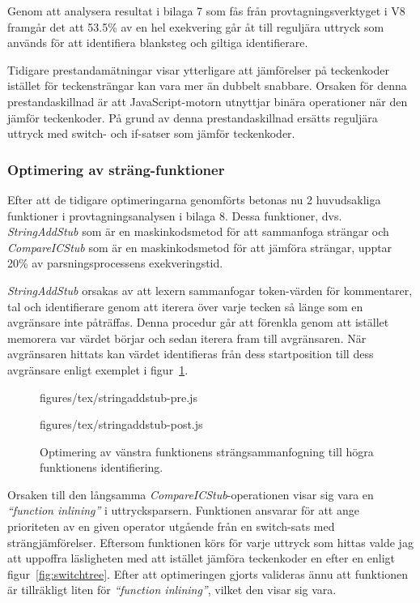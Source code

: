 Genom att analysera resultat i bilaga 7 som fås från provtagningsverktyget i
V8 framgår det att 53.5\% av en hel exekvering går åt till reguljära uttryck
som används för att identifiera blanksteg och giltiga identifierare.

Tidigare prestandamätningar \citep{charcodeat} visar ytterligare att
jämförelser på teckenkoder istället för teckensträngar kan vara mer än dubbelt
snabbare. Orsaken för denna prestandaskillnad är att JavaScript-motorn
utnyttjar binära operationer när den jämför teckenkoder. På grund av denna
prestandaskillnad ersätts reguljära uttryck med switch- och if-satser som
jämför teckenkoder.

\subsubsection{Optimering av sträng-funktioner}

Efter att de tidigare optimeringarna genomförts betonas nu 2 huvudsakliga
funktioner i provtagningsanalysen i bilaga 8. Dessa funktioner, dvs.
\textit{StringAddStub} som är en maskinkodsmetod för att sammanfoga strängar
och \textit{CompareICStub} som är en maskinkodsmetod för att jämföra strängar,
upptar 20\% av parsningsprocessens exekveringstid.

\textit{StringAddStub} orsakas av att lexern sammanfogar token-värden för
kommentarer, tal och identifierare genom att iterera över varje tecken så
länge som en avgränsare inte påträffas. Denna procedur går att förenkla genom
att istället memorera var värdet börjar och sedan iterera fram till
avgränsaren. När avgränsaren hittats kan värdet identifieras från dess
startposition till dess avgränsare enligt exemplet i figur~\ref{fig:stringAddStub}.

\begin{figure}[ht]
  \begin{minipage}[t]{0.5\textwidth}
      {figures/tex/stringaddstub-pre.js}
  \end{minipage}%
  \begin{minipage}[t]{0.5\textwidth}
      {figures/tex/stringaddstub-post.js}
  \end{minipage}
  \caption{Optimering av vänstra funktionens strängsammanfogning till högra
    funktionens identifiering.}
  \label{fig:stringAddStub}
\end{figure}

Orsaken till den långsamma \textit{CompareICStub}-operationen visar sig vara
en \textit{``function inlining''} i uttrycksparsern. Funktionen ansvarar för
att ange prioriteten av en given operator utgående från en switch-sats
med strängjämförelser. Eftersom funktionen körs för varje uttryck som hittas
valde jag att uppoffra läsligheten med att istället jämföra teckenkoder en
efter en enligt figur~\ref{fig:switchtree}. Efter att optimeringen
gjorts valideras ännu att funktionen är tillräkligt liten för
\textit{``function inlining''}, vilket den visar sig vara.

